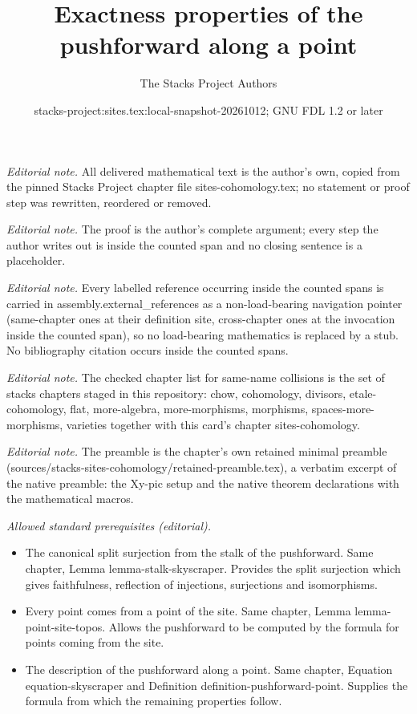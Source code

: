 \documentclass[10pt,a4paper]{amsart}
\title{Exactness properties of the pushforward along a point}
\author{The Stacks Project Authors}
\date{stacks-project:sites.tex:local-snapshot-20261012; GNU FDL 1.2 or later}
\theoremstyle{plain}
\theoremstyle{definition}
\theoremstyle{remark}
\numberwithin{equation}{subsection}
\begin{document}
\maketitle
\noindent\textit{Editorial note.} All delivered mathematical text is the author's own, copied from the pinned Stacks Project chapter file sites-cohomology.tex; no statement or proof step was rewritten, reordered or removed.\par\medskip
\noindent\textit{Editorial note.} The proof is the author's complete argument; every step the author writes out is inside the counted span and no closing sentence is a placeholder.\par\medskip
\noindent\textit{Editorial note.} Every labelled reference occurring inside the counted spans is carried in assembly.external\_references as a non-load-bearing navigation pointer (same-chapter ones at their definition site, cross-chapter ones at the invocation inside the counted span), so no load-bearing mathematics is replaced by a stub. No bibliography citation occurs inside the counted spans.\par\medskip
\noindent\textit{Editorial note.} The checked chapter list for same-name collisions is the set of stacks chapters staged in this repository: chow, cohomology, divisors, etale-cohomology, flat, more-algebra, more-morphisms, morphisms, spaces-more-morphisms, varieties together with this card's chapter sites-cohomology.\par\medskip
\noindent\textit{Editorial note.} The preamble is the chapter's own retained minimal preamble (sources/stacks-sites-cohomology/retained-preamble.tex), a verbatim excerpt of the native preamble: the Xy-pic setup and the native theorem declarations with the mathematical macros.\par\medskip
\noindent\textit{Allowed standard prerequisites (editorial).}\begin{itemize}
\item The canonical split surjection from the stalk of the pushforward. Same chapter, Lemma lemma-stalk-skyscraper. Provides the split surjection which gives faithfulness, reflection of injections, surjections and isomorphisms.
\item Every point comes from a point of the site. Same chapter, Lemma lemma-point-site-topos. Allows the pushforward to be computed by the formula for points coming from the site.
\item The description of the pushforward along a point. Same chapter, Equation equation-skyscraper and Definition definition-pushforward-point. Supplies the formula from which the remaining properties follow.
\end{itemize}\medskip
\end{document}
